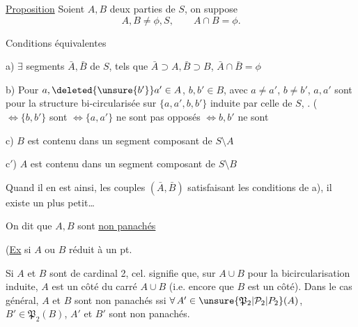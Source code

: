 \uline{Proposition} Soient $A,B$ deux parties  de $S$, on suppose 
\[
 A,B\ne\phi,S,\qquad A\cap B=\phi.
\]

Conditions équivalentes


a) $\exists$ segments $\bar A,\bar B$ de $S$, tels que $\bar A\supset A,\bar B\supset B$, $\bar A\cap\bar B=\phi$

b) Pour $a,\deleted{\unsure{b'}}a'\in A$, $b,b'\in B$, avec $a\ne a'$, $b\ne b'$,  $a,a'$ sont   pour la structure bi-circularisée sur  $\{a,a',b,b'\}$ induite par celle de $S$, . ($\Longleftrightarrow\{b,b'\}$ sont   $\Longleftrightarrow\{a,a'\}$ ne sont pas opposés $\Longleftrightarrow b,b'$ ne sont 

c) $B$ est contenu dans un segment composant de $S\setminus A$

c$'$) $A$ est contenu dans un segment composant de $S\setminus B$


Quand il en est ainsi,  les couples $(\bar A,\bar B)$  satisfaisant les conditions de a), il existe un plus petit\ldots

On dit que $A,B$ sont \uline{non panachés}

(\uline{Ex} si  $A$ ou $B$ réduit à un pt. 

Si $A$ et $B$ sont de cardinal 2, cel. signifie que, sur $A\cup B$ pour la bicircularisation induite, $A$ est un côté du carré $A\cup B$ (i.e. encore que $B$ est un côté). Dans le cas général, $A$ et $B$ sont non panachés ssi $\forall\, A'\in\unsure{\mathfrak P_2|\mathcal P_2|P_2}(A)$, $B'\in\mathfrak P_2(B)$, $A'$ et $B'$ sont non panachés.

